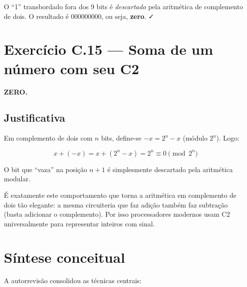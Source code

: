 \documentclass[11pt,a4paper]{article}
\begin{document}
O ``1'' transbordado fora dos 9 bits \'e \emph{descartado} pela aritm\'etica de complemento de dois. O resultado \'e $000000000$, ou seja, \textbf{zero}. ✓

\section{Exerc\'icio C.15 --- Soma de um n\'umero com seu C2}

\begin{resposta}\textbf{ZERO.}\end{resposta}

\subsection*{Justificativa}

Em complemento de dois com $n$ bits, define-se $-x = 2^n - x$ (m\'odulo $2^n$). Logo:

\[
x + (-x) = x + (2^n - x) = 2^n \equiv 0 \pmod{2^n}
\]

O bit que ``vaza'' na posi\c{c}\~ao $n+1$ \'e simplesmente descartado pela aritm\'etica modular.

\begin{obseng}
\'E exatamente este comportamento que torna a aritm\'etica em complemento de dois t\~ao elegante: a mesma circuiteria que faz adi\c{c}\~ao tamb\'em faz subtra\c{c}\~ao (basta adicionar o complemento). Por isso processadores modernos usam C2 universalmente para representar inteiros com sinal.
\end{obseng}

\section*{S\'intese conceitual}

A autorrevis\~ao consolidou as t\'ecnicas centrais:
\end{document}
